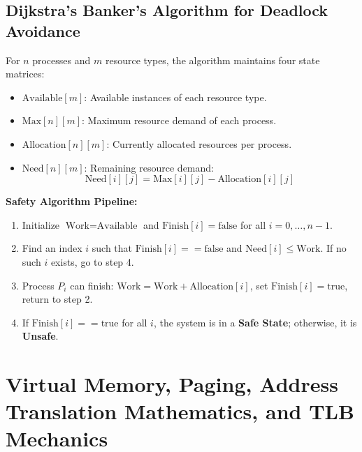 \subsection{Dijkstra's Banker's Algorithm for Deadlock Avoidance}
For $n$ processes and $m$ resource types, the algorithm maintains four state matrices:
\begin{itemize}
    \item $\text{Available}[m]$: Available instances of each resource type.
    \item $\text{Max}[n][m]$: Maximum resource demand of each process.
    \item $\text{Allocation}[n][m]$: Currently allocated resources per process.
    \item $\text{Need}[n][m]$: Remaining resource demand:
    \begin{equation}
    \boxed{\text{Need}[i][j] = \text{Max}[i][j] - \text{Allocation}[i][j]}
    \end{equation}
\end{itemize}

\textbf{Safety Algorithm Pipeline:}
\begin{enumerate}
    \item Initialize $\text{Work} = \text{Available}$ and $\text{Finish}[i] = \text{false}$ for all $i = 0, \dots, n-1$.
    \item Find an index $i$ such that $\text{Finish}[i] == \text{false}$ and $\text{Need}[i] \le \text{Work}$. If no such $i$ exists, go to step 4.
    \item Process $P_i$ can finish: $\text{Work} = \text{Work} + \text{Allocation}[i]$, set $\text{Finish}[i] = \text{true}$, return to step 2.
    \item If $\text{Finish}[i] == \text{true}$ for all $i$, the system is in a \textbf{Safe State}; otherwise, it is \textbf{Unsafe}.
\end{enumerate}

\section{Virtual Memory, Paging, Address Translation Mathematics, and TLB Mechanics}
\label{sec:os_virtual_memory}

